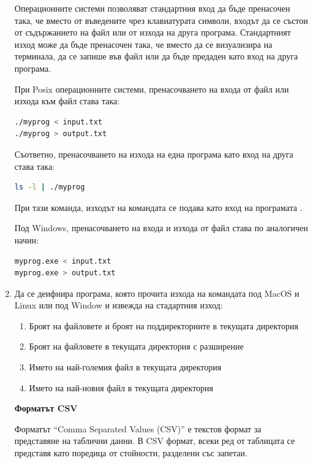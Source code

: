 \begin{enumerate}[resume]
\begin{mdframed}[hidealllines=true,backgroundcolor=gray!20]
Операционните системи позволяват стандартния вход да бъде пренасочен така, че вместо от въведените чрез клавиатурата символи, входът да се състои от съдържанието на файл или от изхода на друга програма. Стандартният изход може да бъде пренасочен така, че вместо да се визуализира на терминала, да се запише във файл или да бъде предаден като вход на друга програма.

При Posix операционните системи, пренасочването на входа от файл или изхода към файл става така: 
\begin{lstlisting}[basicstyle=\small,language=bash]
./myprog < input.txt
./myprog > output.txt
\end{lstlisting}

Съответно, пренасочването на изхода на една програма като вход на друга става така:
\begin{lstlisting}[basicstyle=\small,language=bash]
ls -l | ./myprog
\end{lstlisting}
При тази команда, изходът на командата  се подава като вход на програмата .

Под Windows, пренасочването на входа и изхода от файл става по аналогичен начин:
\begin{lstlisting}[basicstyle=\small,language=bash]
myprog.exe < input.txt
myprog.exe > output.txt
\end{lstlisting}
\end{mdframed}

\item Да се деифнира програма, която прочита изхода на командата  под MacOS и Linux или  под Window и извежда на стадартния изход:
\begin{enumerate}[label=\alph*)]
	\item Броят на файловете и броят на поддиректориите в текущата директория
	\item Броят на файловете в текущата директория с разширение 
	\item Името на най-големия файл в текущата директория
	\item Името на най-новия файл в текущата директория
\end{enumerate}

\begin{mdframed}[hidealllines=true,backgroundcolor=gray!20]
\textbf{Форматът CSV}


Форматът ``Comma Separated Values (CSV)'' е текстов формат за представяне на таблични данни. В CSV формат, всеки ред от таблицата се представя като поредица от стойности, разделени със запетаи. 


\end{mdframed}
\end{enumerate}
